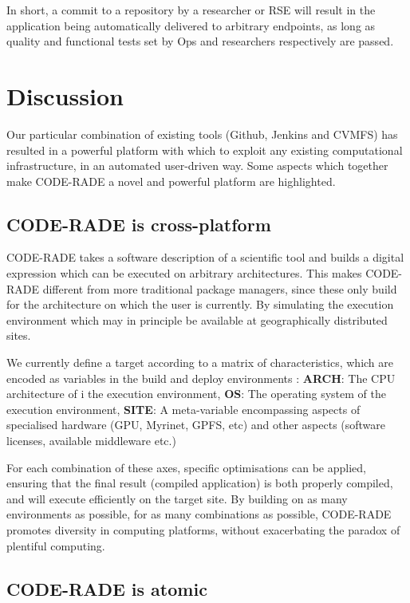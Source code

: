 \documentclass[a4paper]{jpconf}
\begin{document}
In short, a commit to a repository by a researcher or RSE will result in the application being
automatically delivered to arbitrary endpoints, as long as quality and functional tests set by Ops
and researchers respectively are passed.

	\section{Discussion}\label{Discussion}

Our particular combination of existing tools (Github, Jenkins and CVMFS) has resulted in a powerful
platform with which to exploit any existing computational infrastructure, in an automated
user-driven way. Some aspects which together make CODE-RADE a novel and powerful platform are
highlighted.

\subsection{CODE-RADE is cross-platform}

CODE-RADE takes a software description of a scientific tool and builds a digital expression which
can be executed on arbitrary architectures. This makes CODE-RADE different from more traditional
package managers, since these only build for the architecture on which the user is currently. By
simulating the execution environment which may in principle be available at geographically
distributed sites. 

We currently define a target according to a matrix of characteristics, which are
encoded as variables in the build and deploy environments : {\bf ARCH}: The CPU architecture of i
the execution environment, {\bf OS}: The operating system of the execution environment, 
{\bf SITE}: A meta-variable encompassing aspects of specialised hardware (GPU, Myrinet, GPFS, etc) 
and other aspects (software licenses, available middleware etc.)

For each combination of these axes, specific optimisations can be applied, ensuring that the final
result (compiled application) is both properly compiled, and will execute efficiently on the target
site.
By building on as many environments as possible, for as many combinations as possible, CODE-RADE
promotes diversity in computing platforms, without exacerbating the paradox of plentiful computing.

\subsection{CODE-RADE is atomic}
\end{document}
